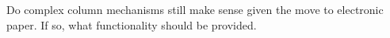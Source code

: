     \stopitemize

\stopsubject

\StopSteps \page \StartSteps

\startsubject[title=Questions]

    \startitemize[packed]

        \startitem Do complex column mechanisms still make sense given the move to electronic paper. \stopitem \FlushStep
        \startitem If so, what functionality should be provided. \stopitem \FlushStep

    \stopitemize

\stopsubject

\StopSteps

\stopdocument
